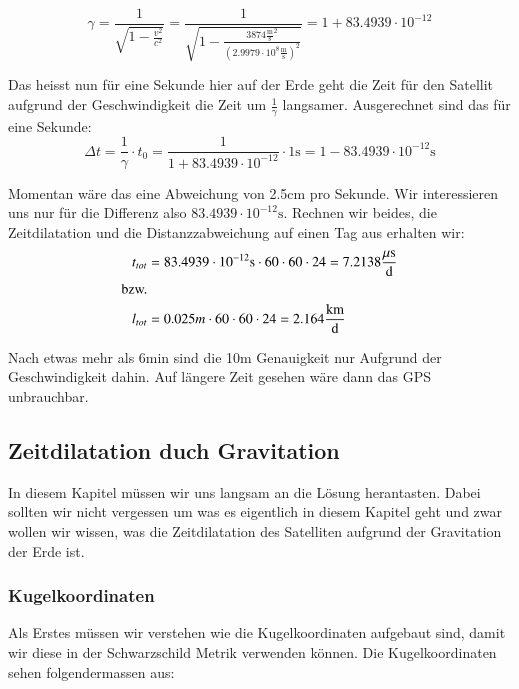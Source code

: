 \begin{refsection}
\begin{equation}
\gamma = \frac{1}{\sqrt{1 - \frac{v^2}{c^2}}} = \frac{1}{\sqrt{1 - \frac{3874 \frac{\text{m}}{\text{s}}^2}{(2.9979 \cdot 10^8 \frac{\text{m}}{\text{s}} )^2}}} = 1 + 83.4939 \cdot 10^{-12}
\end{equation}

\noindent{}Das heisst nun für eine Sekunde hier auf der Erde geht die Zeit für den Satellit aufgrund der Geschwindigkeit die Zeit um \( \frac{1}{\gamma}\) langsamer. Ausgerechnet sind das für eine Sekunde: \\

\begin{equation}
\Delta t = \frac{1}{\gamma} \cdot t_0 = \frac{1}{1 + 83.4939 \cdot 10^{-12}} \cdot 1\text{s} = 1 - 83.4939 \cdot 10^{-12}\text{s}
\end{equation}

\noindent{}Momentan wäre das eine Abweichung von 2.5cm pro Sekunde. Wir interessieren uns nur für die Differenz also \( 83.4939 \cdot 10^{-12}\text{s} \). Rechnen wir beides, die Zeitdilatation und die Distanzzabweichung auf einen Tag aus erhalten wir:
\begin{align*}
t_{tot} &= 83.4939 \cdot 10^{-12}\text{s} \cdot 60 \cdot 60 \cdot 24 = 7.2138  \frac{\mu \text{s}}{\text{d}}
\\
\textnormal{bzw.}
\\
 l_{tot} &= 0.025m \cdot 60 \cdot 60 \cdot 24 = 2.164 \frac{\text{km}}{\text{d}}
\end{align*}

\noindent{}Nach etwas mehr als 6min sind die 10m Genauigkeit nur Aufgrund der Geschwindigkeit dahin. Auf längere Zeit gesehen wäre dann das GPS unbrauchbar.

\subsection{Zeitdilatation duch Gravitation}
In diesem Kapitel müssen wir uns langsam an die Lösung herantasten. Dabei sollten wir nicht vergessen um was es eigentlich in diesem Kapitel geht und zwar wollen wir wissen, was die Zeitdilatation des Satelliten aufgrund der Gravitation der Erde ist.

\subsubsection{Kugelkoordinaten}
Als Erstes müssen wir verstehen wie die Kugelkoordinaten aufgebaut sind, damit wir diese in der Schwarzschild Metrik verwenden können. Die Kugelkoordinaten sehen folgendermassen aus:


\end{refsection}
